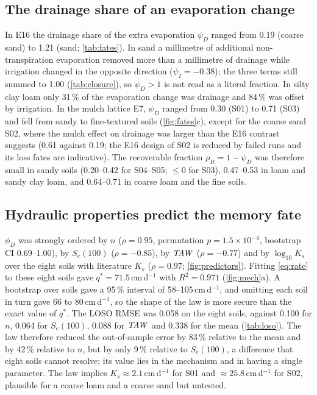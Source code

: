 \documentclass[review,12pt,authoryear]{elsarticle}
\begin{document}
\subsection{The drainage share of an evaporation change}
In E16 the drainage share of the extra evaporation $\psi_D$ ranged from 0.19 (coarse sand) to 1.21 (sand; \cref{tab:fates}). In sand a millimetre of additional non-transpiration evaporation removed more than a millimetre of drainage while irrigation changed in the opposite direction ($\psi_I=-0.38$); the three terms still summed to 1.00 (\cref{tab:closure}), so $\psi_D>1$ is not read as a literal fraction. In silty clay loam only 31\,\% of the evaporation change was drainage and 84\,\% was offset by irrigation. In the mulch lattice E7, $\psi_D$ ranged from 0.30 (S01) to 0.71 (S03) and fell from sandy to fine-textured soils (\cref{fig:fates}c), except for the coarse sand S02, where the mulch effect on drainage was larger than the E16 contrast suggests (0.61 against 0.19; the E16 design of S02 is reduced by failed runs and its loss fates are indicative). The recoverable fraction $\rho_R=1-\psi_D$ was therefore small in sandy soils (0.20--0.42 for S04--S05; $\leq0$ for S03), 0.47--0.53 in loam and sandy clay loam, and 0.64--0.71 in coarse loam and the fine soils.

\subsection{Hydraulic properties predict the memory fate}
$\phi_D$ was strongly ordered by $n$ ($\rho=0.95$, permutation $p=1.5\times10^{-4}$, bootstrap CI 0.69--1.00), by $S_e(100)$ ($\rho=-0.85$), by $\mathit{TAW}$ ($\rho=-0.77$) and by $\log_{10}K_s$ over the eight soils with literature $K_s$ ($\rho=0.97$; \cref{fig:predictors}). Fitting \cref{eq:rate} to these eight soils gave $q^\ast=71.5$\,cm\,d$^{-1}$ with $R^2=0.971$ (\cref{fig:mech}a). A bootstrap over soils gave a 95\,\% interval of 58--105\,cm\,d$^{-1}$, and omitting each soil in turn gave 66 to 80\,cm\,d$^{-1}$, so the shape of the law is more secure than the exact value of $q^\ast$. The LOSO RMSE was 0.058 on the eight soils, against 0.100 for $n$, 0.064 for $S_e(100)$, 0.088 for $\mathit{TAW}$ and 0.338 for the mean (\cref{tab:loso}). The law therefore reduced the out-of-sample error by 83\,\% relative to the mean and by 42\,\% relative to $n$, but by only 9\,\% relative to $S_e(100)$, a difference that eight soils cannot resolve; its value lies in the mechanism and in having a single parameter. The law implies $K_s\approx2.1$\,cm\,d$^{-1}$ for S01 and $\approx25.8$\,cm\,d$^{-1}$ for S02, plausible for a coarse loam and a coarse sand but untested.
\end{document}
